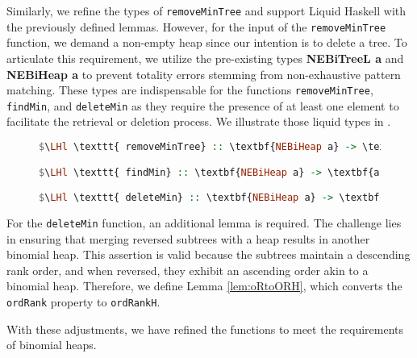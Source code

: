 \documentclass{clmthesis}
\begin{document}
Similarly, we refine the types of \texttt{removeMinTree} and support Liquid Haskell with the previously defined lemmas. However, for the input of the \texttt{removeMinTree} function, we demand a non-empty heap since our intention is to delete a tree. To articulate this requirement, we utilize the pre-existing types \textbf{NEBiTreeL a} and \textbf{NEBiHeap a} to prevent totality errors stemming from non-exhaustive pattern matching. These types are indispensable for the functions \texttt{removeMinTree}, \texttt{findMin}, and \texttt{deleteMin} as they require the presence of at least one element to facilitate the retrieval or deletion process. We illustrate those liquid types in .

\begin{figure}[h]
\begin{lstlisting}[mathescape=true, language=haskell, caption={Liquid Type of \texttt{removeMinTree}, \texttt{findMin} and \texttt{deleteMin}.},captionpos=b, label=fig:liquidtypes]
$\LHl \texttt{ removeMinTree} :: \textbf{NEBiHeap a} -> \textbf{(BiTree a, BiHeap a) } \LHr$

$\LHl \texttt{ findMin} :: \textbf{NEBiHeap a} -> \textbf{a } \LHr$

$\LHl \texttt{ deleteMin} :: \textbf{NEBiHeap a} -> \textbf{BiHeap a } \LHr$
\end{lstlisting}
\end{figure}

For the \texttt{deleteMin} function, an additional lemma is required. The challenge lies in ensuring that merging reversed subtrees with a heap results in another binomial heap. This assertion is valid because the subtrees maintain a descending rank order, and when reversed, they exhibit an ascending order akin to a binomial heap. Therefore, we define Lemma \ref{lem:oRtoORH}, which converts the \texttt{ordRank} property to \texttt{ordRankH}.


With these adjustments, we have refined the functions to meet the requirements of binomial heaps.
\end{document}
